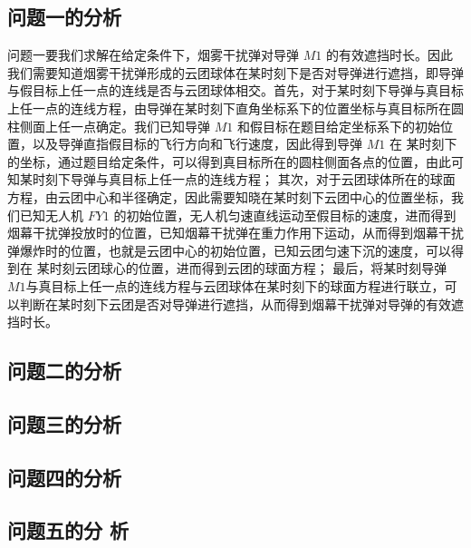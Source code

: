 \documentclass[../main.tex]{subfiles}
\begin{document}
\subsection{问题一的分析}
\par 问题一要我们求解在给定条件下，烟雾干扰弹对导弹 \( M1 \) 的有效遮挡时长。因此我们需要知道烟雾干扰弹形成的云团球体在某时刻下是否对导弹进行遮挡，即导弹与假目标上任一点的连线是否与云团球体相交。首先，对于某时刻下导弹与真目标上任一点的连线方程，由导弹在某时刻下直角坐标系下的位置坐标与真目标所在圆柱侧面上任一点确定。我们已知导弹 \( M1 \) 和假目标在题目给定坐标系下的初始位置，以及导弹直指假目标的飞行方向和飞行速度，因此得到导弹 \( M1 \) 在 某时刻下的坐标，通过题目给定条件，可以得到真目标所在的圆柱侧面各点的位置，由此可知某时刻下导弹与真目标上任一点的连线方程；
其次，对于云团球体所在的球面方程，由云团中心和半径确定，因此需要知晓在某时刻下云团中心的位置坐标，我们已知无人机 \( FY1 \) 的初始位置，无人机匀速直线运动至假目标的速度，进而得到烟幕干扰弹投放时的位置，已知烟幕干扰弹在重力作用下运动，从而得到烟幕干扰弹爆炸时的位置，也就是云团中心的初始位置，已知云团匀速下沉的速度，可以得到在 某时刻云团球心的位置，进而得到云团的球面方程；
最后，将某时刻导弹\( M1 \)与真目标上任一点的连线方程与云团球体在某时刻下的球面方程进行联立，可以判断在某时刻下云团是否对导弹进行遮挡，从而得到烟幕干扰弹对导弹的有效遮挡时长。
\subsection{问题二的分析}




\subsection{问题三的分析}




\subsection{问题四的分析}




\subsection{问题五的分
析}  
\end{document}
